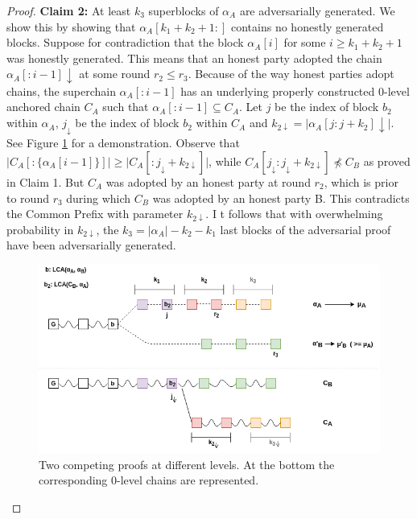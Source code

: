 \begin{proof}
	\textbf{Claim 2:} At least $k_3$ superblocks of $\alpha_A$ are adversarially generated.
	We show this by showing that $\alpha_A[k_1 + k_2 + 1:]$ contains no honestly generated
	blocks. Suppose for contradiction that the block $\alpha_A[i]$ for some $i \geq k_1 +
	k_2 + 1$ was honestly generated. This means that an honest party adopted the chain
	$\alpha_A[:i - 1]\downarrow$ at some round $r_2 \leq r_3$. Because of the way honest
	parties adopt chains, the superchain $\alpha_A[:i - 1]$ has an underlying properly
	constructed 0-level anchored chain $C_A$ such that $\alpha_A[:i - 1] \subseteq C_A$.
	Let $j$ be the index of block $b_2$ within $\alpha_A$, $j_\downarrow$ be the index
	of block $b_2$ within $C_A$ and $k_{2\downarrow} = \vert \alpha_A[j:j+k_2]\downarrow\vert$.
	See Figure \ref{fig:proof} for a demonstration. Observe that $\vert C_A[:\{\alpha_A[i-1]\}]
	\vert \geq \vert C_A[:{j_\downarrow}+k_{2\downarrow}] \vert$, while
	$C_A[j_\downarrow:j_\downarrow + k_{2\downarrow}] \npreceq C_B$ as proved in
	Claim 1. But $C_A$ was adopted by an honest party at round $r_2$, which is prior
	to round $r_3$ during which $C_B$ was adopted by an honest party B. This 
	contradicts the Common Prefix\cite{backbone} with parameter $k_{2\downarrow}$. I
	t follows that with overwhelming probability in $k_{2\downarrow}$, the $k_3 =
	\vert \alpha_A \vert - k_2 - k_1$ last blocks of the adversarial proof have
	been adversarially generated.\\

	\begin{figure}[h]
		\begin{center}
			\includegraphics[width=0.9\columnwidth]{figures/proof.png}
		\end{center}
		\caption{Two competing proofs at different levels. At the bottom the
		corresponding 0-level chains are represented.}
		\label{fig:proof}
	\end{figure}


\end{proof}
